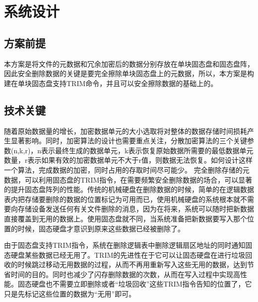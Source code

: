 \chapter{系统设计}
\section{方案前提}
本方案是将文件的元数据和冗余加密后的数据分别存放在单块固态盘和固态盘阵，因此安全删除数据的关键是要完全擦除单块固态盘上的元数据，所以，本方案是构建在单块固态盘支持TRIM命令，并且可以安全擦除数据的基础上的。
\section{技术关键}
随着原始数据量的增长，加密数据单元的大小选取将对整体的数据存储时间损耗产生显著影响。同时，加密算法的设计也需要重点关注，分散加密算法的三个关键参数(n,k,r)，n表示最终生成的数据单元，k表示恢复原始数据所需要的最低数据单元数量，r表示如果有效的加密数据单元不大于r值，则数据无法恢复。如何设计这样一个算法，完成数据的加密，同时占用的存取时间尽可能少。 
完全删除存储的元数据，可以利用固态盘的TRIM指令，在需要频繁安全删除数据的场合，可以显著的提升固态盘阵列的性能。传统的机械硬盘在删除数据的时候，简单的在逻辑数据表内把存储要删除的数据的位置标记为可用而已，使用机械硬盘的系统根本就不需要向存储设备发送任何有关文件删除的消息，因为在将来，系统可以随时把新数据直接覆盖到无用的数据上。使用固态盘就不同，当系统准备把新数据要写入那个位置的时候，固态硬盘才意识到原来这些数据已经被删除了。


由于固态盘支持TRIM指令，系统在删除逻辑表中删除逻辑扇区地址的同时通知固态硬盘某些数据已经无用了。TRIM的先进性在于它可以让固态硬盘在进行垃圾回收的时候跳过移动无用数据的过程，从而不再用重新写入这些无用的数据，达到节省时间的目的。同时也减少了闪存删除数据的次数，从而在写入过程中实现高性能。固态硬盘也不需要立即删除或者“垃圾回收”这些TRIM指令告知的位置了，它只是先标记这些位置的数据为“无用”即可。


